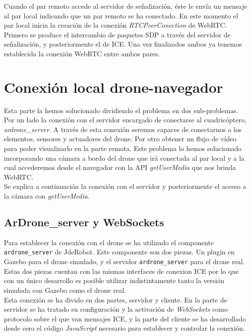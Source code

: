 Cuando el par remoto accede al servidor de señalización, éste le envía un mensaje al par local indicando que un par remoto se ha conectado. En este momento el par local inicia la creación de la conexión \emph{RTCPeerConection} de WebRTC. Primero se produce el intercambio de paquetes SDP a través del servidor de señalización, y posteriormente el de ICE. Una vez finalizados ambos ya tenemos establecida la conexión WebRTC entre ambos pares.\\

\section{Conexión local drone-navegador}

Esta parte la hemos solucionado dividiendo el problema en dos sub-problemas. Por un lado la conexión con el servidor encargado de conectarse al cuadricóptero, \emph{ardrone\_server}. A través de esta conexión seremos capaces de conectarnos a los elementos, sensores y actuadores del drone. Por otro obtener un flujo de vídeo para poder visualizarlo en la parte remota. Este problema lo hemos solucionado incorporando una cámara a bordo del drone que irá conectada al par local y a la cual accederemos desde el navegador con la API \emph{getUserMedia} que nos brinda WebRTC.\\

Se explica a continuación la conexión con el servidor y posteriormente el acceso a la cámara con \emph{getUserMedia}.\\


\subsection{ArDrone\_server y WebSockets}\label{subsec:ardrone}

Para establecer la conexión con el drone se ha utilizado el componente \texttt{ardrone\_server} de JdeRobot. Este componente son dos piezas. Un plugin en Gazebo para el drone simulado, y el servidor \texttt{ardrone\_server} para el drone real. Estas dos piezas cuentan con las mismas interfaces de conexion ICE por lo que con un único desarrollo es posible utilizar indistintamente tanto la versión simulada con Gazebo como el drone real.\\

Esta conexión se ha divido en dos partes, servidor y cliente. En la parte de servidor se ha tratado su configuración y la activación de \emph{WebSockets} como protocolo sobre el que van mensajes ICE, y la parte del cliente se ha desarrollado desde cero el código \emph{JavaScript} necesario para establecer y controlar la conexión.\\

